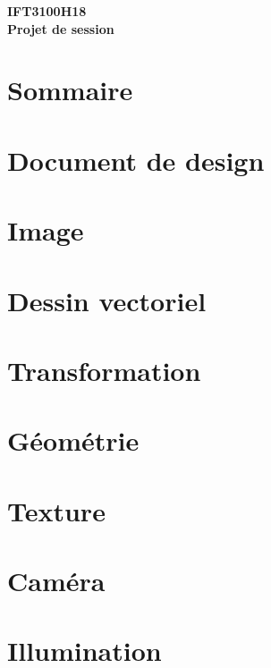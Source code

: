 \documentclass[12pt]{article}
\begin{document}
\begin{center}
{\scriptsize \textbf{IFT3100H18\\}}
\textbf{Projet de session\\}
\end{center}

\section*{Sommaire}

\pagebreak

\section*{Document de design}

\pagebreak

\section{Image}

\pagebreak

\section{Dessin vectoriel}

\pagebreak

\section{Transformation}

\pagebreak

\section{Géométrie}

\pagebreak

\section{Texture}

\pagebreak

\section{Caméra}

\pagebreak

\section{Illumination}
\end{document}
